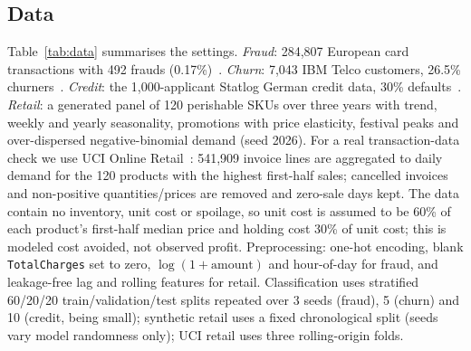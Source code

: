 \documentclass[conference]{IEEEtran}
\begin{document}
\subsection{Data}
Table~\ref{tab:data} summarises the settings. \emph{Fraud}: 284,807 European card transactions with 492 frauds
(0.17\%)~\cite{dalpozzolo2015}. \emph{Churn}: 7,043 IBM Telco customers, 26.5\% churners~\cite{ibmtelco}. \emph{Credit}:
the 1,000-applicant Statlog German credit data, 30\% defaults~\cite{hofmann1994}. \emph{Retail}: a generated panel of 120
perishable SKUs over three years with trend, weekly and yearly seasonality, promotions with price elasticity, festival
peaks and over-dispersed negative-binomial demand (seed 2026). For a real transaction-data check we use UCI Online
Retail~\cite{uciretail}: 541,909 invoice lines are aggregated to daily demand for the 120 products with the highest
first-half sales; cancelled invoices and non-positive quantities/prices are removed and zero-sale days kept. The data
contain no inventory, unit cost or spoilage, so unit cost is assumed to be 60\% of each product's first-half median
price and holding cost 30\% of unit cost; this is modeled cost avoided, not observed profit. Preprocessing: one-hot
encoding, blank \texttt{TotalCharges} set to zero, $\log(1{+}\text{amount})$ and hour-of-day for fraud, and leakage-free
lag and rolling features for retail. Classification uses stratified 60/20/20 train/validation/test splits repeated over 3
seeds (fraud), 5 (churn) and 10 (credit, being small); synthetic retail uses a fixed chronological split (seeds vary
model randomness only); UCI retail uses three rolling-origin folds.

\begin{table}[t]
\centering
\caption{Scenarios and value definitions (vs.\ doing nothing).}
\label{tab:data}
\scriptsize
\setlength{\tabcolsep}{2.5pt}
\end{table}
\end{document}
